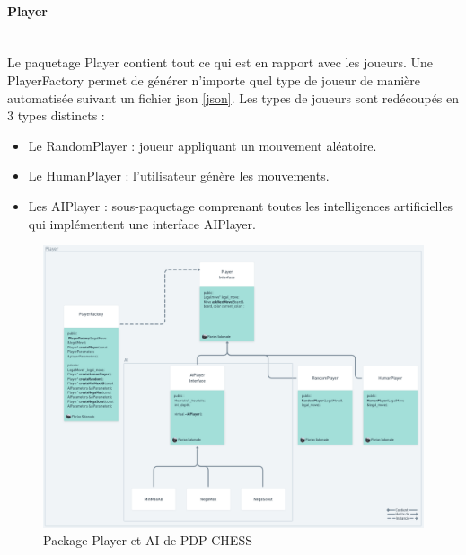 \huge\documentclass{article}
\begin{document}
    \paragraph{Player}
    ~~\\
    \newline
    Le paquetage Player contient tout ce qui est en rapport avec les joueurs.
    Une PlayerFactory permet de générer n'importe quel type de joueur de manière automatisée suivant un fichier json \ref{json}.
    Les types de joueurs sont redécoupés en 3 types distincts :
    \begin{itemize}
        \item Le RandomPlayer : joueur appliquant un mouvement aléatoire.
        \item Le HumanPlayer : l'utilisateur génère les mouvements.
        \item Les AIPlayer : sous-paquetage comprenant toutes les intelligences artificielles qui implémentent une interface AIPlayer.
        \newline
    \end{itemize}

    \begin{figure}[!h]
        \centering
        \includegraphics[scale = 0.40]{img/Package/Player.png}
        \caption{Package Player et AI de PDP CHESS}
        \label{pck:player}
    \end{figure}

    \newpage
\end{document}
